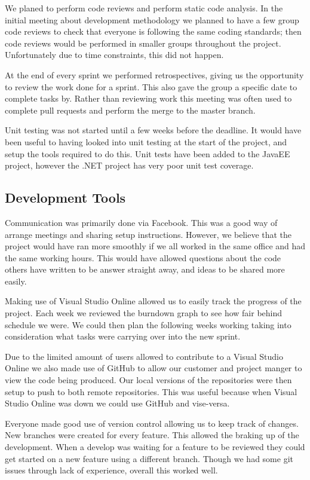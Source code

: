 We planed to perform code reviews and perform static code analysis. In the initial meeting about development methodology we planned to have a few group code reviews to check that everyone is following the same coding standards; then code reviews would be performed in smaller groups throughout the project. Unfortunately due to time constraints, this did not happen.

At the end of every sprint we performed retrospectives, giving us the opportunity to review the work done for a sprint. This also gave the group a specific date to complete tasks by. Rather than reviewing work this meeting was often used to complete pull requests and perform the merge to the master branch. 

Unit testing was not started until a few weeks before the deadline. It would have been useful to having looked into unit testing at the start of the project, and setup the tools required to do this. Unit tests have been added to the JavaEE project, however the .NET project has very poor unit test coverage. 

\subsection{Development Tools}

Communication was primarily done via Facebook. This was a good way of arrange meetings and sharing setup instructions. However, we believe that the project would have ran more smoothly if we all worked in the same office and had the same working hours. This would have allowed questions about the code others have written to be answer straight away, and ideas to be shared more easily. 

Making use of Visual Studio Online allowed us to easily track the progress of the project. Each week we reviewed the burndown graph to see how fair behind schedule we were. We could then plan the following weeks working taking into consideration what tasks were carrying over into the new sprint. 

Due to the limited amount of users allowed to contribute to a Visual Studio Online we also made use of GitHub to allow our customer and project manger to view the code being produced. Our local versions of the repositories were then setup to push to both remote repositories. This was useful because when Visual Studio Online was down we could use GitHub and vise-versa. 

Everyone made good use of version control allowing us to keep track of changes. New branches were created for every feature. This allowed the braking up of the development. When a develop was waiting for a feature to be reviewed they could get started on a new feature using a different branch. Though we had some git issues through lack of experience, overall this worked well.

